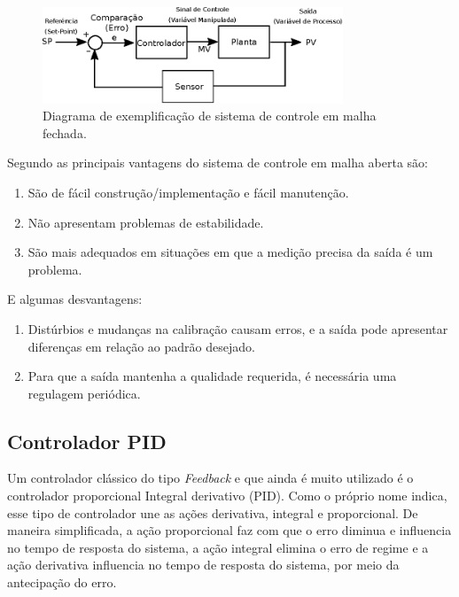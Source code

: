 \begin{figure}[H]
    \centering
    \includegraphics[width=0.8\textwidth]{figuras/ilustracoes/diagrama_sistema_malha_fechada.eps}
    \caption{Diagrama de exemplificação de sistema de controle em malha fechada.}
    \label{fig:ilustracao_sistema_malha_fechada}
\end{figure}


Segundo \cite{ogata2011engenharia} as principais vantagens do sistema de controle em malha aberta são:
\begin{enumerate}
    \item São de fácil construção/implementação e fácil manutenção.
    \item Não apresentam problemas de estabilidade.
    \item São mais adequados em situações em que a medição precisa da saída é um problema.
\end{enumerate}

E algumas desvantagens:

\begin{enumerate}
    \item Distúrbios e mudanças na calibração causam erros, e a saída pode apresentar diferenças
    em relação ao padrão desejado.
    \item Para que a saída mantenha a qualidade requerida, é necessária uma regulagem periódica.
\end{enumerate}


\subsection{Controlador PID}
Um controlador clássico do tipo \emph{Feedback} e que ainda é muito utilizado é o controlador proporcional Integral derivativo (PID). Como o próprio nome indica, esse tipo de controlador une as ações derivativa, integral e proporcional. De maneira simplificada, a ação proporcional faz com que o erro diminua e influencia no tempo de resposta do sistema, a ação integral elimina o erro de regime e a ação derivativa influencia no tempo de resposta do sistema, por meio da antecipação do erro.


